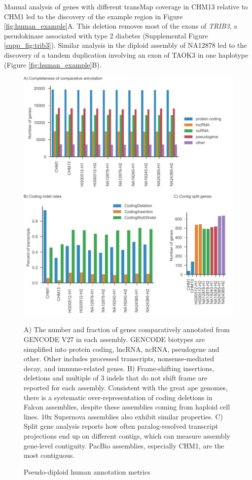 \documentclass[fleqn,10pt]{wlscirep}
\begin{document}
Manual analysis of genes with different transMap coverage in CHM13 relative to CHM1 led to the discovery of the example region in Figure \ref{fig:human_example}A. This deletion removes most of the exons of \textit{TRIB3}, a pseudokinase associated with type 2 diabetes \cite{shi2009association} (Supplemental Figure \ref{supp_fig:trib3}). Similar analysis in the diploid assembly of NA12878 led to the discovery of a tandem duplication involving an exon of TAOK3 in one haplotype (Figure \ref{fig:human_example}B).

\begin{figure}
\centering
\includegraphics[width=\textwidth,height=0.75\textheight,keepaspectratio]{human-metrics.pdf}
\caption{Pseudo-diploid human annotation metrics}
A) The number and fraction of genes comparatively annotated from GENCODE V27 in each assembly. GENCODE biotypes are simplified into protein coding, lncRNA, ncRNA, pseudogene and other. Other includes processed transcripts, nonsense-mediated decay, and immune-related genes. B) Frame-shifting insertions, deletions and multiple of 3 indels that do not shift frame are reported for each assembly. Consistent with the great ape genomes, there is a systematic over-representation of coding deletions in Falcon assemblies, despite these assemblies coming from haploid cell lines. 10x Supernova assemblies also exhibit similar properties. C) Split gene analysis reports how often paralog-resolved transcript projections end up on different contigs, which can measure assembly gene-level contiguity. PacBio assemblies, especially CHM1, are the most contiguous.
\label{fig:human_metrics}
\end{figure}
\end{document}
